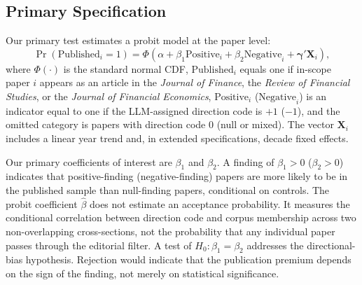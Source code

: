 \documentclass[12pt]{article}
\newcommand{\JF}{\textit{Journal of Finance}}
\newcommand{\RFS}{\textit{Review of Financial Studies}}
\newcommand{\JFE}{\textit{Journal of Financial Economics}}
\DeclareMathOperator{\Prob}{Pr}
\begin{document}
\subsection{Primary Specification}

Our primary test estimates a probit model at the paper level:
\begin{equation}
\label{eq:probit}
\Prob(\text{Published}_{i} = 1) =
\Phi\!\left(\alpha + \beta_1 \text{Positive}_i + \beta_2 \text{Negative}_i
            + \boldsymbol{\gamma}' \mathbf{X}_i\right),
\end{equation}
where $\Phi(\cdot)$ is the standard normal CDF,
$\text{Published}_{i}$ equals one if in-scope paper $i$ appears as an article
in the \JF{}, the \RFS{}, or the \JFE{},
$\text{Positive}_i$ ($\text{Negative}_i$) is an indicator equal to one if the
LLM-assigned direction code is $+1$ ($-1$), and the omitted category is papers
with direction code $0$ (null or mixed).  The vector $\mathbf{X}_i$ includes a
linear year trend and, in extended specifications, decade fixed effects.

Our primary coefficients of interest are $\beta_1$ and $\beta_2$.
A finding of $\beta_1 > 0$ ($\beta_2 > 0$) indicates that positive-finding
(negative-finding) papers are more likely to be in the published sample than
null-finding papers, conditional on controls.  The probit
coefficient $\hat\beta$ does not estimate an acceptance probability.  It
measures the conditional correlation between direction code and corpus
membership across two non-overlapping cross-sections, not the probability
that any individual paper passes through the editorial filter.
A test of $H_0\colon \beta_1 = \beta_2$ addresses the directional-bias
hypothesis.  Rejection would indicate that the publication premium depends on the
sign of the finding, not merely on statistical significance.
\end{document}
